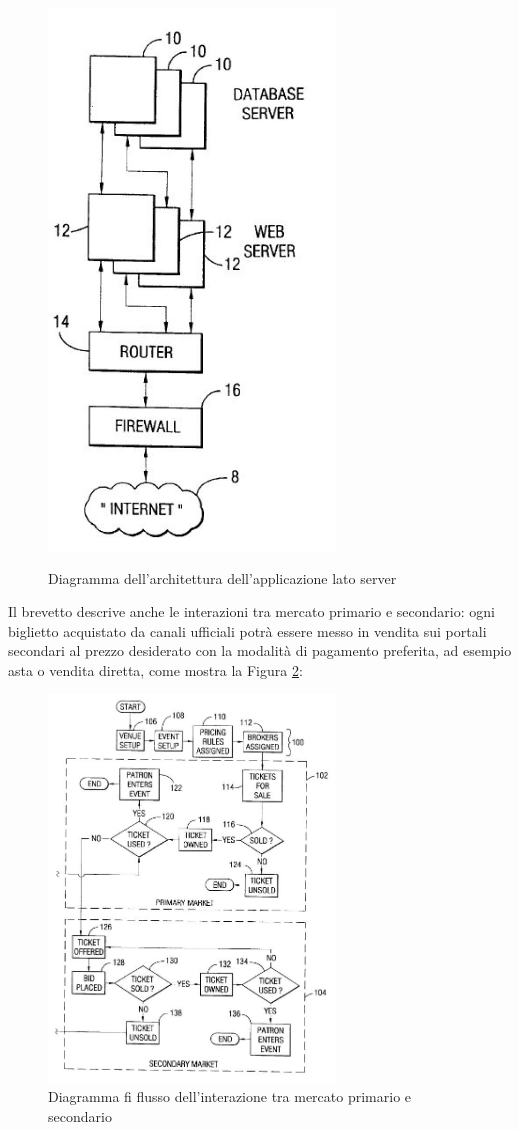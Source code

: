 \begin{figure}[htbp]
	\centering
	\includegraphics[width=0.68\textwidth, height=15cm, keepaspectratio]{chapter2/immagini/brevetto_app}
	\caption{Diagramma dell'architettura dell'applicazione lato server}
	\label{server}
\end{figure}
Il brevetto descrive anche le interazioni tra mercato primario e secondario: ogni biglietto acquistato da canali ufficiali potrà essere messo in vendita sui portali secondari al prezzo desiderato con la modalità di pagamento preferita, ad esempio asta o vendita diretta, come mostra la Figura \ref{mercati}:
\begin{figure}[htbp]
	\centering
	\includegraphics[width=0.68\textwidth]{chapter2/immagini/brevetto1}
	\caption{Diagramma fi flusso dell'interazione tra mercato primario e secondario}
	\label{mercati}
\end{figure}
